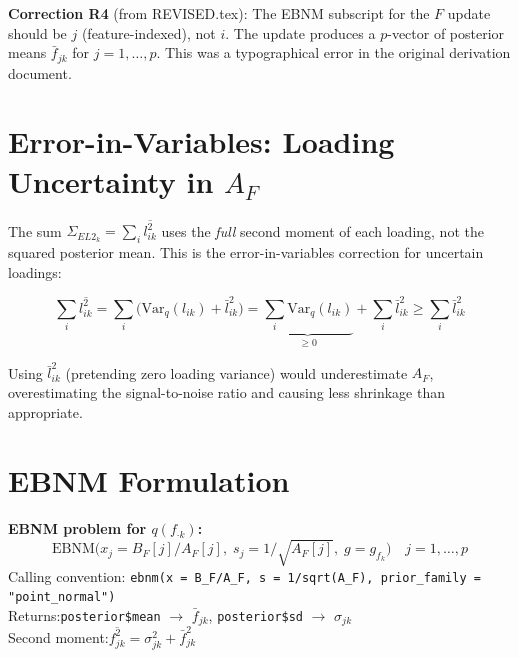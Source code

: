 \documentclass[11pt]{article}
\newcommand{\lbar}[2]{\bar{l}_{#1#2}}
\newcommand{\lsec}[2]{\overline{l^2_{#1#2}}}
\begin{document}
\begin{correctionbox}
\textbf{Correction R4} (from REVISED.tex): The EBNM subscript for the $F$
update should be $j$ (feature-indexed), not $i$.  The update produces a
$p$-vector of posterior means $\bar{f}_{jk}$ for $j = 1,\ldots,p$.
This was a typographical error in the original derivation document.
\end{correctionbox}

\section{Error-in-Variables: Loading Uncertainty in $A_F$}\label{sec:eiv}

The sum $\Sigma_{EL2_k} = \sum_i\lsec{i}{k}$ uses the \emph{full} second
moment of each loading, not the squared posterior mean.  This is the
error-in-variables correction for uncertain loadings:

\begin{equation}
  \sum_i\lsec{i}{k}
  = \sum_i\bigl(\mathrm{Var}_q(l_{ik}) + \lbar{i}{k}^2\bigr)
  = \underbrace{\sum_i\mathrm{Var}_q(l_{ik})}_{\geq 0}
    + \sum_i\lbar{i}{k}^2
  \geq \sum_i\lbar{i}{k}^2
  \label{eq:second-moment}
\end{equation}

Using $\lbar{i}{k}^2$ (pretending zero loading variance) would
underestimate $A_F$, overestimating the signal-to-noise ratio and
causing less shrinkage than appropriate.

\section{EBNM Formulation}\label{sec:ebnm}

\begin{ebnmbox}
\textbf{EBNM problem for $q(f_{\cdot k})$:}
\begin{equation}
  \mathrm{EBNM}\bigl(x_j = B_F[j]/A_F[j],\; s_j = 1/\sqrt{A_F[j]},\;
    g = g_{f_k}\bigr)
  \quad j = 1,\ldots,p
  \label{eq:ebnm}
\end{equation}
Calling convention:\quad
\texttt{ebnm(x = B\_F/A\_F, s = 1/sqrt(A\_F), prior\_family = "point\_normal")}\\[4pt]
Returns:\quad \texttt{posterior\$mean} $\to$ $\bar{f}_{jk}$,\quad
\texttt{posterior\$sd} $\to$ $\sigma_{jk}$\\
Second moment:\quad $\overline{f^2_{jk}} = \sigma_{jk}^2 + \bar{f}_{jk}^2$
\end{ebnmbox}
\end{document}
